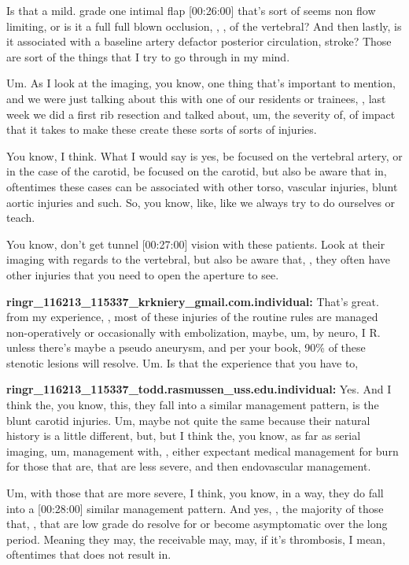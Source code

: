 \documentclass[
]{book}
\begin{document}
Is that a mild. grade one intimal flap {[}00:26:00{]} that's sort of seems
non flow limiting, or is it a full full blown occlusion, , , of the
vertebral? And then lastly, is it associated with a baseline artery
defactor posterior circulation, stroke? Those are sort of the things
that I try to go through in my mind.

Um. As I look at the imaging, you know, one thing that's important to
mention, and we were just talking about this with one of our residents
or trainees, , last week we did a first rib resection and talked about,
um, the severity of, of impact that it takes to make these create these
sorts of sorts of injuries.

You know, I think. What I would say is yes, be focused on the vertebral
artery, or in the case of the carotid, be focused on the carotid, but
also be aware that in, oftentimes these cases can be associated with
other torso, vascular injuries, blunt aortic injuries and such. So, you
know, like, like we always try to do ourselves or teach.

You know, don't get tunnel {[}00:27:00{]} vision with these patients. Look
at their imaging with regards to the vertebral, but also be aware that,
, they often have other injuries that you need to open the aperture to
see.

\textbf{ringr\_116213\_115337\_krkniery\_gmail.com.individual:} That's great.
from my experience, , most of these injuries of the routine rules are
managed non-operatively or occasionally with embolization, maybe, um, by
neuro, I R. unless there's maybe a pseudo aneurysm, and per your book,
90\% of these stenotic lesions will resolve. Um. Is that the experience
that you have to,

\textbf{ringr\_116213\_115337\_todd.rasmussen\_uss.edu.individual:} Yes. And I
think the, you know, this, they fall into a similar management pattern,
is the blunt carotid injuries. Um, maybe not quite the same because
their natural history is a little different, but, but I think the, you
know, as far as serial imaging, um, management with, , either expectant
medical management for burn for those that are, that are less severe,
and then endovascular management.

Um, with those that are more severe, I think, you know, in a way, they
do fall into a {[}00:28:00{]} similar management pattern. And yes, , the
majority of those that, , that are low grade do resolve for or become
asymptomatic over the long period. Meaning they may, the receivable may,
may, if it's thrombosis, I mean, oftentimes that does not result in.
\end{document}
